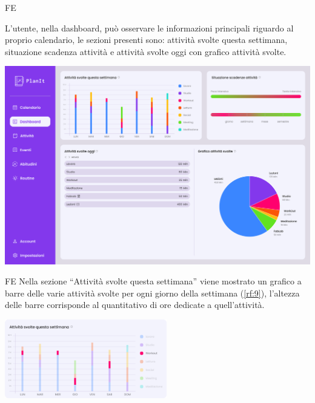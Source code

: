\begin{listaPersonale}{FE}
    
     L’utente, nella dashboard, può osservare le informazioni principali riguardo al proprio calendario, le sezioni presenti sono: attività svolte questa settimana, situazione scadenza attività e attività svolte oggi con grafico attività svolte.
    \begin{center}
        \includegraphics[width=1\textwidth]{img/FrontEnd/Dashboard/Dashboard.png}
    \end{center}
    
    \begin{listaPersonale2}{FE}
         Nella sezione “Attività svolte questa settimana” viene mostrato un grafico a barre delle varie attività svolte per ogni giorno della settimana (\ref{rf:9}), l’altezza delle barre corrisponde al quantitativo di ore dedicate a quell’attività.

        \begin{center}
            \includegraphics[width=0.53\textwidth,height=0.18\textheight]{img/FrontEnd/Dashboard/graficoBarre.png} %
        \end{center}
        

\end{listaPersonale2}
\end{listaPersonale}
